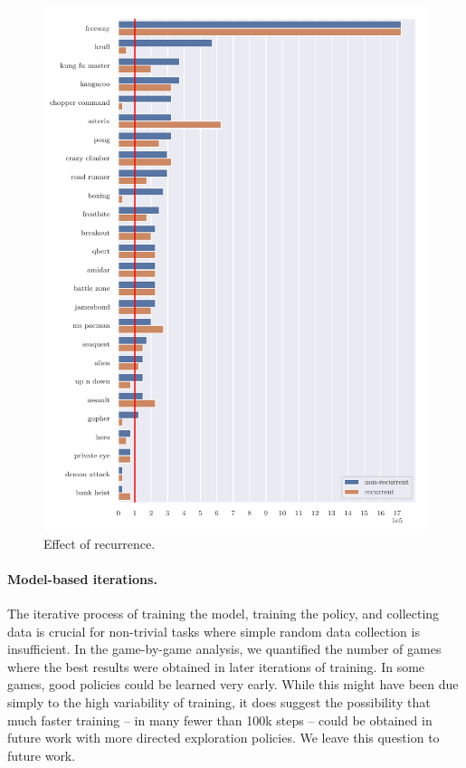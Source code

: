\begin{figure}
\centering
\includegraphics[width=0.9\columnwidth]{figures/graph_Effect_of_a_recurrent_architecture.pdf}
\caption{Effect of recurrence.}
\label{fig:comp_recurr}
\end{figure}


\paragraph{Model-based iterations.}
The iterative process of training the model, training the policy, and collecting data is crucial for non-trivial tasks where simple random data collection is insufficient. In the game-by-game analysis, we quantified the number of games where the best results were obtained in later iterations of training. In some games, good policies could be learned very early. While this might have been due simply to the high variability of training, it does suggest the possibility that much faster training -- in many fewer than 100k steps -- could be obtained in future work with more directed exploration policies. We leave this question to future work.

